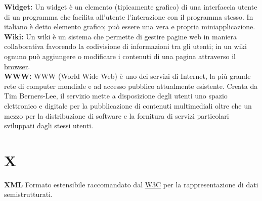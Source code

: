\hypertarget{widget}{}
\textbf{Widget:}
Un widget \` e un elemento (tipicamente grafico) di una interfaccia utente di un programma che facilita all'utente l'interazione con il programma stesso. In italiano \`  e detto  elemento grafico; pu\` o essere una vera e propria miniapplicazione.\\

\hypertarget{wiki}{}
\textbf{Wiki:}
Un wiki \`e un sistema che permette di gestire pagine web in maniera collaborativa favorendo la codivisione di informazioni tra gli utenti; in un wiki ognuno pu\`o aggiungere o modificare i contenuti di una pagina attraverso il \hyperlink{browser}{\underline{browser}}.\\

\hypertarget{www}{}
\textbf{WWW:}
WWW (World Wide Web) \`e uno dei servizi di Internet, la pi\`u grande rete di computer mondiale e ad accesso pubblico attualmente esistente.
Creata da Tim Berners-Lee, il servizio mette a disposizione degli utenti uno spazio elettronico e digitale per la pubblicazione di contenuti multimediali oltre che un mezzo per la distribuzione di software e la fornitura di servizi particolari sviluppati dagli stessi utenti. \\

\section*{X}
\hypertarget{xml}{}
\textbf{XML}
\text Formato estensibile raccomandato dal \hyperlink{w3c}{\underline{W3C}} per la rappresentazione di dati semistrutturati.\\


